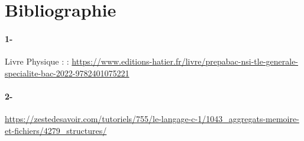 \documentclass[a4paper, 12pt]{article}
\begin{document}
\appendix  %
\section{Bibliographie}
\paragraph{1- }
Livre Physique : : \url{https://www.editions-hatier.fr/livre/prepabac-nsi-tle-generale-specialite-bac-2022-9782401075221}
\paragraph{2- }
\url{https://zestedesavoir.com/tutoriels/755/le-langage-c-1/1043_aggregats-memoire-et-fichiers/4279_structures/}
\end{document}
